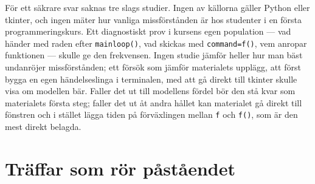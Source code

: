 För ett säkrare svar saknas tre slags studier.  Ingen av källorna gäller
Python eller tkinter, och ingen mäter hur vanliga missförstånden är
hos studenter i en första programmeringskurs.  Ett diagnostiskt prov i
kursens egen population --- vad händer med raden efter
\texttt{mainloop()}, vad skickas med
\texttt{command=f()}, vem anropar funktionen --- skulle ge
den frekvensen.  Ingen studie jämför heller hur man bäst undanröjer
missförstånden; ett försök som jämför materialets upplägg, att först
bygga en egen händelseslinga i terminalen, med att gå direkt till
tkinter skulle visa om modellen bär.  Faller det ut till modellens
fördel bör den stå kvar som materialets första steg; faller det ut åt
andra hållet kan materialet gå direkt till fönstren och i stället
lägga tiden på förväxlingen mellan \texttt{f} och
\texttt{f()}, som är den mest direkt belagda.

\section{Träffar som rör påståendet}
\label{sec:handelser-traffar-grafik}

